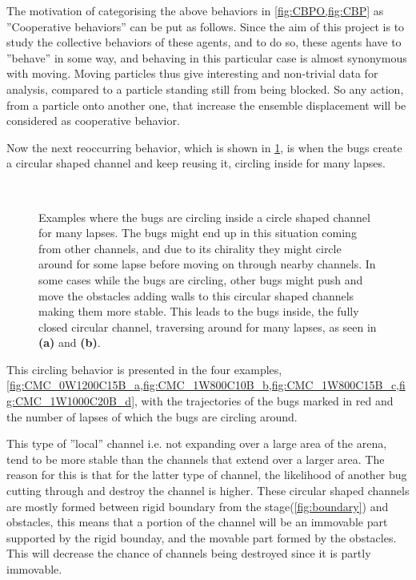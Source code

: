 The motivation of categorising the above behaviors in \cref{fig:CBPO,fig:CBP} as 
''Cooperative behaviors'' can be put as follows. Since 
the aim of this project is to study the collective behaviors of these agents, 
and to do so, these agents have to ''behave'' in some way, and behaving in 
this particular case is almost synonymous with moving. Moving particles thus give 
interesting and non-trivial data for analysis, compared to a particle standing still 
from being blocked. So any action, from a particle onto another one, that increase the 
ensemble displacement will be considered as cooperative behavior.


Now the next reoccurring behavior, which is shown 
in \cref{fig:CMC}, is when the bugs create a circular 
shaped channel and keep reusing it, circling inside for 
many lapses. 


\begin{figure}[htpb!]
\centering
{}\quad
{}\\
\quad
{}
\caption{Examples where the bugs are circling inside 
a circle shaped channel for many lapses. The bugs might 
end up in this situation coming from other channels, 
and due to its chirality they might circle around for some 
lapse before moving on through nearby channels. In some cases 
while the bugs are circling, other bugs might push and move 
the obstacles adding walls to this circular shaped channels making 
them more stable. This leads to the bugs inside, the fully closed 
circular channel, traversing around for many lapses, 
as seen in \textbf{(a)} and \textbf{(b)}.} 
\label{fig:CMC}
\end{figure}

This circling behavior is presented in the four examples, 
\cref{fig:CMC_0W1200C15B_a,fig:CMC_1W800C10B_b,fig:CMC_1W800C15B_c,fig:CMC_1W1000C20B_d}, 
with the trajectories of the bugs marked in red and the number 
of lapses of which the bugs are circling around. 

This type of ''local'' channel i.e. not expanding over a large 
area of the arena, tend to be more stable than the channels 
that extend over a larger area. The reason for this is that 
for the latter type of channel, the likelihood of another bug 
cutting through and destroy the channel is higher. These circular 
shaped channels are mostly formed between rigid boundary from the stage(\cref{fig:boundary}) 
and obstacles, this means that a portion of the channel will be an 
immovable part supported by the rigid bounday, and the movable part formed 
by the obstacles. This will decrease the chance of channels being 
destroyed since it is partly immovable.

